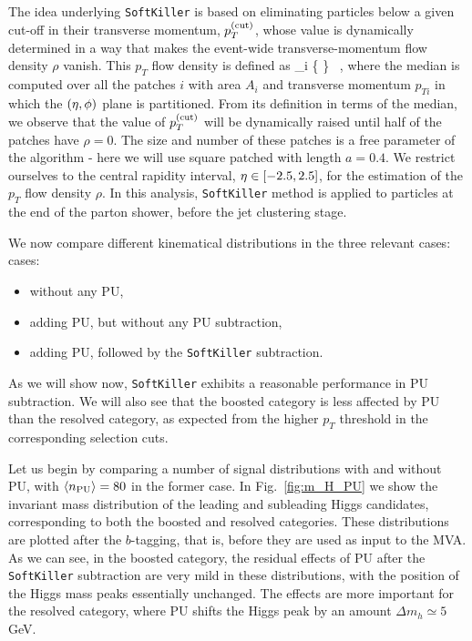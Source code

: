 The idea underlying {\tt SoftKiller} is based on eliminating particles
below a given cut-off in their transverse momentum, $p_T^{\rm (cut)}$, whose
value is dynamically determined in a way that makes the event-wide
transverse-momentum flow density $\rho$ vanish.
%
This $p_T$ flow density is defined as
\be
\rho{}_i \Bigg\{ \Bigg\} \, ,
\ee
where the median is computed over all the patches $i$ with area
$A_i$ and transverse momentum $p_{Ti}$ in which the $\left( \eta,\phi\right)$ plane
is partitioned.
%
From its definition in terms of the median,
we observe that the value of $p_T^{(\rm cut)}$
will be dynamically raised until half of the patches have $\rho=0$.
%
The size and number of these patches is a free parameter of the algorithm -
here we will use square patched with length $a=0.4$.
%
We restrict ourselves to the central rapidity interval,
$\eta \in \left[ -2.5, 2.5\right]$, for the estimation of the
$p_T$ flow density $\rho$.
%
In this analysis, {\tt SoftKiller} method is applied
to particles at the end of the parton shower, before
the jet clustering stage.

%
We now compare different kinematical distributions
in the three relevant cases:
cases:
\begin{itemize}
\item without any PU,
\item adding PU, but without any PU subtraction,
  \item adding PU, followed by the {\tt SoftKiller} subtraction.
\end{itemize}
As we will show now, {\tt SoftKiller} exhibits a reasonable
performance in PU subtraction.
%
We will also see that the boosted category is less affected
by PU than the resolved category, as expected from the higher
$p_T$ threshold in the corresponding selection cuts.

Let us begin by comparing
a number of signal distributions with
and without PU, with $\left\langle n_{\rm PU}\right\rangle=80$ in the former
case.
%
In Fig.~\ref{fig:m_H_PU} we show the invariant mass distribution
of the leading and subleading Higgs candidates, corresponding to both
the boosted
and resolved categories.
%
These distributions are plotted after the $b$-tagging, that is,
before they are used as input to the MVA.
%
As we can see, in the boosted category, the residual effects of PU
after the {\tt SoftKiller} subtraction are very mild in these
distributions, with the position of the Higgs mass peaks essentially
unchanged.
%
The effects are more important for the resolved category, where PU
shifts the Higgs peak by an amount $\Delta m_h \simeq 5$ GeV.

